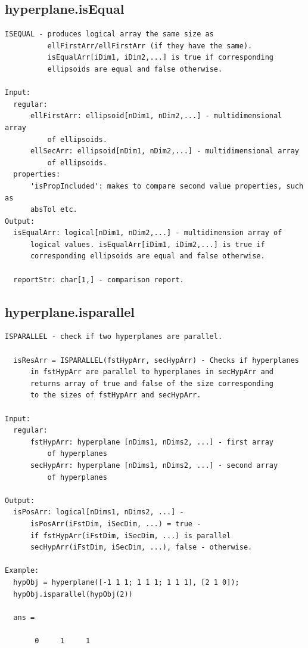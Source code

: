 \documentclass[letterpaper,10pt,english]{sphinxmanual}
\begin{document}
\subsection{hyperplane.isEqual}
\label{chap_functions:hyperplane-isequal}
\begin{Verbatim}[commandchars=\\\{\}]
ISEQUAL - produces logical array the same size as
          ellFirstArr/ellFirstArr (if they have the same).
          isEqualArr[iDim1, iDim2,...] is true if corresponding
          ellipsoids are equal and false otherwise.

Input:
  regular:
      ellFirstArr: ellipsoid[nDim1, nDim2,...] - multidimensional array
          of ellipsoids.
      ellSecArr: ellipsoid[nDim1, nDim2,...] - multidimensional array
          of ellipsoids.
  properties:
      'isPropIncluded': makes to compare second value properties, such as
      absTol etc.
Output:
  isEqualArr: logical[nDim1, nDim2,...] - multidimension array of
      logical values. isEqualArr[iDim1, iDim2,...] is true if
      corresponding ellipsoids are equal and false otherwise.

  reportStr: char[1,] - comparison report.
\end{Verbatim}


\subsection{hyperplane.isparallel}
\label{chap_functions:hyperplane-isparallel}
\begin{Verbatim}[commandchars=\\\{\}]
ISPARALLEL - check if two hyperplanes are parallel.

  isResArr = ISPARALLEL(fstHypArr, secHypArr) - Checks if hyperplanes
      in fstHypArr are parallel to hyperplanes in secHypArr and
      returns array of true and false of the size corresponding
      to the sizes of fstHypArr and secHypArr.

Input:
  regular:
      fstHypArr: hyperplane [nDims1, nDims2, ...] - first array
          of hyperplanes
      secHypArr: hyperplane [nDims1, nDims2, ...] - second array
          of hyperplanes

Output:
  isPosArr: logical[nDims1, nDims2, ...] -
      isPosArr(iFstDim, iSecDim, ...) = true -
      if fstHypArr(iFstDim, iSecDim, ...) is parallel
      secHypArr(iFstDim, iSecDim, ...), false - otherwise.

Example:
  hypObj = hyperplane([-1 1 1; 1 1 1; 1 1 1], [2 1 0]);
  hypObj.isparallel(hypObj(2))

  ans =

       0     1     1
\end{Verbatim}
\end{document}
